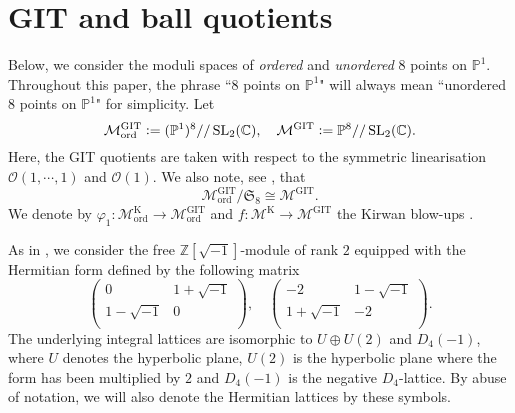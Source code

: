 \documentclass[12pt, pdftex]{amsart}
\theoremstyle{plain}
\theoremstyle{definition}
\numberwithin{equation}{section}
\def\Z{{\mathbb Z}}
\def\C{{\mathbb C}}
\def\P{{\mathbb P}}
\def\SS{{\mathfrak S}}
\def\SL{\mathop{\mathrm{SL}}\nolimits}
\def\ord{\mathrm{ord}}
\def\GIT{\mathrm{GIT}}
\def\K{\mathrm{K}}
\def\M{\mathcal{M}}
\def\OO{\mathscr{O}}
\newcommand{\defeq}{\vcentcolon=}
\begin{document}
\section{GIT and ball quotients}
\label{section:preparation}


Below, we consider the moduli spaces of \textit{ordered} and \textit{unordered} 8 points on $\P^1$.
Throughout this paper, the phrase ``8 points on $\P^1$" will always  mean ``unordered 8 points on $\P^1$" for simplicity.
Let
\[\M_{\ord}^{\GIT}\defeq (\P^1)^8//\SL_2(\C),\quad \M^{\GIT}\defeq \P^8//\SL_2(\C).\]
Here, the GIT quotients are taken with respect to the symmetric linearisation $\OO(1,\cdots, 1)$ and $\OO(1)$. We also note, see \cite[Theorem 1.1]{KM11}, that  
\[
\M_{\ord}^{\GIT}/\SS_8 \cong  \M^{\GIT}.
\]
We denote by $\varphi_1:\M_{\ord}^{\K}\to\M_{\ord}^{\GIT}$ and $f:\M^{\K}\to\M^{\GIT}$ the Kirwan blow-ups \cite{Ki85}.

 As in \cite{Ko07a}, 
 we consider the free  $\Z[\sqrt{-1}]$-module of rank $2$ equipped with the Hermitian form defined by the following matrix
 \[\begin{pmatrix}
0 & 1+\sqrt{-1} \\
1-\sqrt{-1} & 0 \\
\end{pmatrix},\quad
 \begin{pmatrix}
-2 & 1-\sqrt{-1} \\
1+\sqrt{-1} & -2 \\
\end{pmatrix}.
\]
The underlying integral lattices are isomorphic to $U \oplus U(2)$ and $D_4(-1)$, where $U$ denotes the hyperbolic plane, $U(2)$ is the hyperbolic plane where the form has been 
multiplied by $2$ and $D_4(-1)$ is the negative $D_4$-lattice. By abuse of notation, we will also denote the Hermitian lattices by these symbols.
\end{document}
